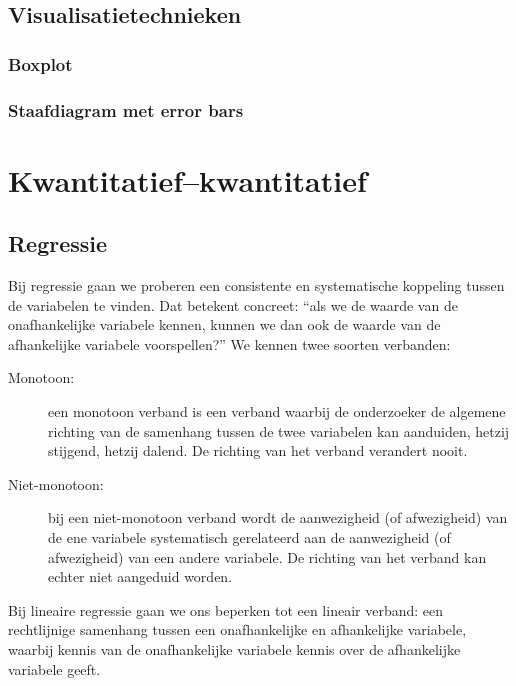 \subsection{Visualisatietechnieken}
\label{ssec:kwal-kwant-visualisatie}

\subsubsection{Boxplot}


\subsubsection{Staafdiagram met error bars}


\section{Kwantitatief--kwantitatief}


\subsection{Regressie}
\label{sec:regressie}

Bij  regressie gaan we proberen een consistente en systematische koppeling tussen de variabelen te vinden. Dat betekent concreet: ``als we de waarde van de onafhankelijke variabele kennen, kunnen we dan ook de waarde van de afhankelijke variabele voorspellen?'' We kennen twee soorten verbanden:

\begin{description}
  \item [Monotoon:] een monotoon verband is een verband waarbij de onderzoeker de algemene richting van de samenhang tussen de twee variabelen kan aanduiden, hetzij stijgend, hetzij dalend. De richting van het verband verandert nooit.
  \item [Niet-monotoon:] bij een niet-monotoon verband wordt de aanwezigheid (of afwezigheid) van de ene variabele systematisch gerelateerd aan de aanwezigheid (of afwezigheid) van een andere variabele. De richting van het verband kan echter niet aangeduid worden.
\end{description}

Bij lineaire regressie gaan we ons beperken tot een lineair verband: een rechtlijnige samenhang tussen een onafhankelijke en afhankelijke variabele, waarbij kennis van de onafhankelijke variabele kennis over de afhankelijke variabele geeft.

